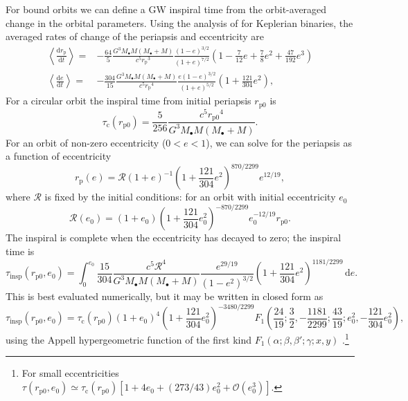 \documentclass[useAMS,usedcolumn,usegraphicx,usenatbib]{mn2e}
\newcommand{\sub}[1]{\ensuremath{_\mathrm{#1}}}
\newcommand{\dd}{\ensuremath{\mathrm{d}}}
\newcommand{\diff}[2]{\ensuremath{\frac{\dd {#1}}{\dd {#2}}}}
\newcommand{\intd}[4]{\ensuremath{\displaystyle \int_{#1}^{#2}{#3}\,\dd{#4}}}
\newcommand{\order}[1]{\ensuremath{\mathcal{O}({#1})}}
\begin{document}
\begin{onecolumn}
For bound orbits we can define a GW inspiral time from the orbit-averaged change in the orbital parameters. Using the analysis of \citet{Peters1964} for Keplerian binaries, the averaged rates of change of the periapsis and eccentricity are
\begin{align}
\left\langle\diff{r\sub{p}}{t}\right\rangle = {} & -\frac{64}{5}\frac{G^3M_\bullet M(M_\bullet + M)}{c^5r\sub{p}^3}\frac{(1 - e)^{3/2}}{(1 + e)^{7/2}}\left(1 - \frac{7}{12}e + \frac{7}{8}e^2 + \frac{47}{192}e^3\right) \\
\left\langle\diff{e}{t}\right\rangle = {} & -\frac{304}{15}\frac{G^3M_\bullet M(M_\bullet + M)}{c^5r\sub{p}^4}\frac{e(1 - e)^{3/2}}{(1 + e)^{5/2}}\left(1 + \frac{121}{304}e^2\right),
\end{align}
For a circular orbit the inspiral time from initial periapsis $r\sub{p0}$ is
\begin{equation}
\tau\sub{c}(r\sub{p0}) = \frac{5}{256}\frac{c^5r\sub{p0}^4}{G^3M_\bullet M(M_\bullet + M)}.
\end{equation}
For an orbit of non-zero eccentricity ($0 < e < 1$), we can solve for the periapsis as a function of eccentricity
\begin{equation}
r\sub{p}(e) = \mathcal{R}(1 + e)^{-1}\left(1 + \frac{121}{304}e^2\right)^{870/2299}e^{12/19},
\end{equation}
where $\mathcal{R}$ is fixed by the initial conditions: for an orbit with initial eccentricity $e_0$
\begin{equation}
\mathcal{R}(e_0) = (1 + e_0)\left(1 + \frac{121}{304}e_0^2\right)^{-870/2299}e_0^{-12/19}r\sub{p0}.
\end{equation}
The inspiral is complete when the eccentricity has decayed to zero; the inspiral time is \citep{Peters1964}
\begin{equation}
\tau\sub{insp}(r\sub{p0},e_0) = \intd{0}{e_0}{\frac{15}{304}\frac{c^5\mathcal{R}^4}{G^3M_\bullet M(M_\bullet + M)}\frac{e^{29/19}}{(1-e^2)^{3/2}}\left(1 + \frac{121}{304}e^2\right)^{1181/2299}}{e}.
\end{equation}
This is best evaluated numerically, but it may be written in closed form as
\begin{equation}
\tau\sub{insp}(r\sub{p0},e_0) = \tau\sub{c}(r\sub{p0})(1 + e_0)^4\left(1 + \frac{121}{304}e_0^2\right)^{-3480/2299} F_1\left(\frac{24}{19};\frac{3}{2},-\frac{1181}{2299};\frac{43}{19};e_0^2,-\frac{121}{304}e_0^2\right),
\label{eq:Bound_inspiral}
\end{equation}
using the Appell hypergeometric function of the first kind $F_1(\alpha;\beta,\beta';\gamma;x,y)$ \citep[16.15.1]{Olver2010}.\footnote{For small eccentricities $\tau(r\sub{p0},e_0) \simeq \tau\sub{c}(r\sub{p0})[1 + 4e_0 + (273/43)e_0^2 + \order{e_0^3}]$.}


\end{onecolumn}
\end{document}
